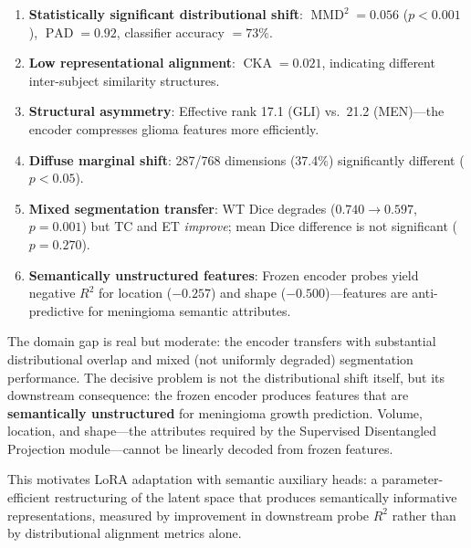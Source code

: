 \documentclass[11pt,a4paper]{article}
\DeclareMathOperator{\MMD}{MMD}
\DeclareMathOperator{\CKA}{CKA}
\DeclareMathOperator{\PAD}{PAD}
\theoremstyle{definition}
\begin{document}
\begin{tcolorbox}[colback=blue!5!white,colframe=blue!50!black,title=Key Findings]
\begin{enumerate}[nosep]
  \item \textbf{Statistically significant distributional shift}: $\MMD^2 = 0.056$ ($p < 0.001$), $\PAD = 0.92$, classifier accuracy $= 73\%$.
  \item \textbf{Low representational alignment}: $\CKA = 0.021$, indicating different inter-subject similarity structures.
  \item \textbf{Structural asymmetry}: Effective rank 17.1 (GLI) vs.\ 21.2 (MEN)---the encoder compresses glioma features more efficiently.
  \item \textbf{Diffuse marginal shift}: 287/768 dimensions (37.4\%) significantly different ($p < 0.05$).
  \item \textbf{Mixed segmentation transfer}: WT Dice degrades ($0.740 \to 0.597$, $p = 0.001$) but TC and ET \emph{improve}; mean Dice difference is not significant ($p = 0.270$).
  \item \textbf{Semantically unstructured features}: Frozen encoder probes yield negative $R^2$ for location ($-0.257$) and shape ($-0.500$)---features are anti-predictive for meningioma semantic attributes.
\end{enumerate}
\end{tcolorbox}

\medskip

The domain gap is real but moderate: the encoder transfers with substantial distributional overlap and mixed (not uniformly degraded) segmentation performance. The decisive problem is not the distributional shift itself, but its downstream consequence: the frozen encoder produces features that are \textbf{semantically unstructured} for meningioma growth prediction. Volume, location, and shape---the attributes required by the Supervised Disentangled Projection module---cannot be linearly decoded from frozen features.

This motivates LoRA adaptation with semantic auxiliary heads: a parameter-efficient restructuring of the latent space that produces semantically informative representations, measured by improvement in downstream probe $R^2$ rather than by distributional alignment metrics alone.
\end{document}
